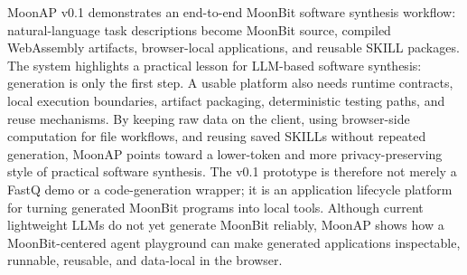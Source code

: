 \documentclass[11pt]{article}
\newcommand{\moonap}{MoonAP}
\newcommand{\skill}{SKILL}
\newcommand{\wasm}{WebAssembly}
\begin{document}
\moonap{} v0.1 demonstrates an end-to-end MoonBit software synthesis workflow: natural-language task descriptions become MoonBit source, compiled \wasm{} artifacts, browser-local applications, and reusable \skill{} packages. The system highlights a practical lesson for LLM-based software synthesis: generation is only the first step. A usable platform also needs runtime contracts, local execution boundaries, artifact packaging, deterministic testing paths, and reuse mechanisms. By keeping raw data on the client, using browser-side computation for file workflows, and reusing saved \skill{}s without repeated generation, \moonap{} points toward a lower-token and more privacy-preserving style of practical software synthesis. The v0.1 prototype is therefore not merely a FastQ demo or a code-generation wrapper; it is an application lifecycle platform for turning generated MoonBit programs into local tools. Although current lightweight LLMs do not yet generate MoonBit reliably, \moonap{} shows how a MoonBit-centered agent playground can make generated applications inspectable, runnable, reusable, and data-local in the browser.



\end{document}
